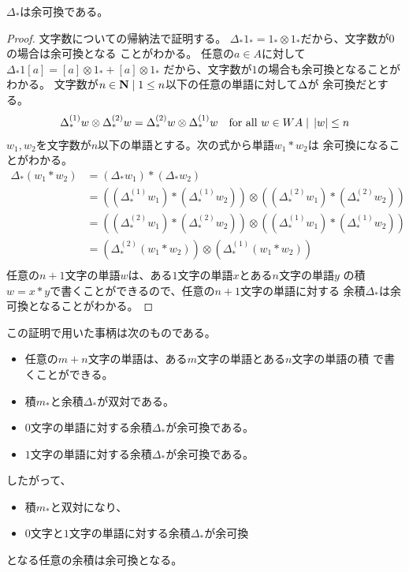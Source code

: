 	\begin{proposition}\label{prop:Delta_*は余可換} %
		$\Delta_*$は余可換である。
	\end{proposition} %
	\begin{proof} %
		文字数についての帰納法で証明する。
		$\Delta_*1_*=1_*\otimes 1_*$だから、文字数が$0$の場合は余可換となる
		ことがわかる。
		任意の$a\in A$に対して$\Delta_*1[a]=[a]\otimes 1_*+[a]\otimes 1_*$
		だから、文字数が$1$の場合も余可換となることがわかる。
		文字数が$n\in{\mathbf{N}}\;\vert\; 1\le n$以下の任意の単語に対して$\Delta\*$が
		余可換だとする。
		\begin{equation*}\begin{split} %
			\Delta_*^{(1)}w\otimes\Delta_*^{(2)}w
			=\Delta_*^{(2)}w\otimes\Delta_*^{(1)}w
			\quad\text{for all }w\in WA\bou \zettai{w}\le n
		\end{split}\end{equation*} %
		$w_1,w_2$を文字数が$n$以下の単語とする。次の式から単語$w_1*w_2$は
		余可換になることがわかる。
		\begin{equation*}\begin{split} %
			\Delta_*(w_1*w_2) &= (\Delta_*w_1)*(\Delta_*w_2) \\
			&= \left((\Delta_*^{(1)}w_1)*(\Delta_*^{(1)}w_2)\right)
			\otimes \left((\Delta_*^{(2)}w_1)*(\Delta_*^{(2)}w_2)\right) \\
			&= \left((\Delta_*^{(2)}w_1)*(\Delta_*^{(2)}w_2)\right)
			\otimes \left((\Delta_*^{(1)}w_1)*(\Delta_*^{(1)}w_2)\right) \\
			& = \left(\Delta_*^{(2)}(w_1*w_2)\right)
			\otimes \left(\Delta_*^{(1)}(w_1*w_2)\right) \\
		\end{split}\end{equation*} %
		任意の$n+1$文字の単語$w$は、ある$1$文字の単語$x$とある$n$文字の単語$y$
		の積$w=x*y$で書くことができるので、任意の$n+1$文字の単語に対する
		余積$\Delta_*$は余可換となることがわかる。
	\end{proof} %

	この証明で用いた事柄は次のものである。
	\begin{itemize} %
		\item 任意の$m+n$文字の単語は、ある$m$文字の単語とある$n$文字の単語の積
		で書くことができる。
		\item 積$m_*$と余積$\Delta_*$が双対である。
		\item $0$文字の単語に対する余積$\Delta_*$が余可換である。
		\item $1$文字の単語に対する余積$\Delta_*$が余可換である。
	\end{itemize} %
	したがって、
	\begin{itemize} %
		\item 積$m_*$と双対になり、
		\item $0$文字と$1$文字の単語に対する余積$\Delta_*$が余可換
	\end{itemize} %
	となる任意の余積は余可換となる。

